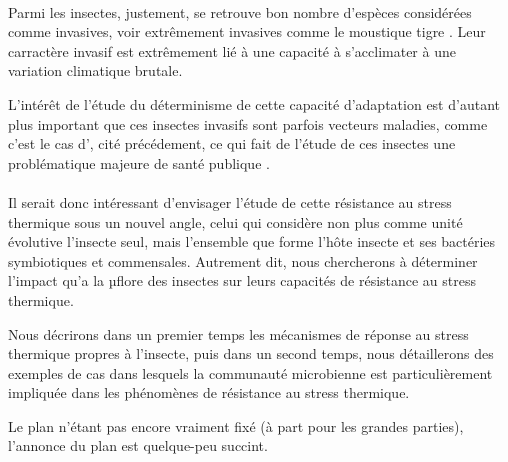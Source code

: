 \paragraph{} %
\label{par:intro2}

Parmi les insectes, justement, se retrouve bon nombre d'espèces considérées
comme invasives, voir extrêmement invasives comme le moustique tigre
. Leur carractère invasif est extrêmement lié à une
capacité à s'acclimater à une variation climatique brutale.


L'intérêt de l'étude du déterminisme de cette capacité d'adaptation est
d'autant plus important que ces insectes invasifs sont parfois vecteurs
maladies, comme c'est le cas d', cité précédement, ce
qui fait de l'étude de ces insectes une problématique majeure de santé
publique \cite{schaffner2013}.



\paragraph{} %
\label{par:intro3}

Il serait donc intéressant d'envisager l'étude de cette résistance au stress
thermique sous un nouvel angle, celui qui considère non plus comme unité
évolutive l'insecte seul, mais l'ensemble que forme l'hôte insecte et ses
bactéries symbiotiques et commensales. Autrement dit, nous chercherons à
déterminer l'impact qu'a la µflore des insectes sur leurs capacités de
résistance au stress thermique.

Nous décrirons dans un premier temps les mécanismes de réponse au stress
thermique propres à l'insecte, puis dans un second temps, nous détaillerons
des exemples de cas dans lesquels la communauté microbienne est
particulièrement impliquée dans les phénomènes de résistance au stress
thermique.

\begin{note}
Le plan n'étant pas encore vraiment fixé (à part pour les grandes parties), l'annonce du plan est quelque-peu succint.
\end{note}


